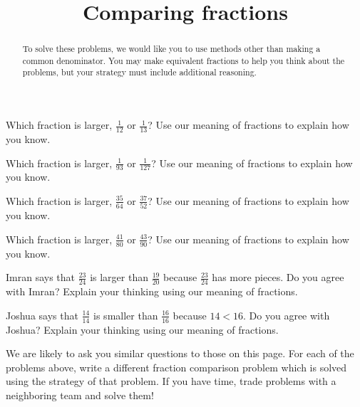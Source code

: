 \documentclass[nooutcomes,noauthor]{ximera}
\title{Comparing fractions}
\begin{document}
\begin{abstract}
To solve these problems, we would like you to use methods other than making a common denominator. You may make equivalent fractions to help you think about the problems, but your strategy must include additional reasoning.
\end{abstract}

\maketitle



\begin{problem}
Which fraction is larger, $\frac{1}{12}$ or $\frac{1}{13}$? Use our meaning of fractions to explain how you know.
\end{problem}


\begin{problem}
Which fraction is larger, $\frac{1}{93}$ or $\frac{1}{127}$? Use our meaning of fractions to explain how you know.
\end{problem}


\begin{problem}
Which fraction is larger, $\frac{35}{64}$ or $\frac{37}{52}$? Use our meaning of fractions to explain how you know.
\end{problem}



\begin{problem}
Which fraction is larger, $\frac{41}{80}$ or $\frac{43}{90}$? Use our meaning of fractions to explain how you know.
\end{problem}



\begin{problem}

Imran says that $\frac{23}{24}$ is larger than $\frac{19}{20}$ because $\frac{23}{24}$ has more pieces. Do you agree with Imran? Explain your thinking using our meaning of fractions.

\end{problem}


\begin{problem}
Joshua says that $\frac{14}{14}$ is smaller than $\frac{16}{16}$ because $14 < 16$. Do you agree with Joshua? Explain your thinking using our meaning of fractions.
\end{problem}


\begin{problem}
We are likely to ask you similar questions to those on this page. For each of the problems above, write a different fraction comparison problem which is solved using the strategy of that problem. If you have time, trade problems with a neighboring team and solve them!
\end{problem}
\end{document}
